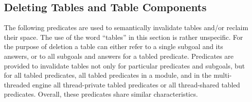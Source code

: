 \begin{description}


\subsection{Deleting Tables and Table Components}
\label{sec:TablePred:Deleting}

The following predicates are used to semantically invalidate tables
and/or reclaim their space. The use of the word ``tables'' in this
section is rather unspecific.  For the purpose of deletion a table can
either refer to a single subgoal and its answers, or to all subgoals
and answers for a tabled predicate.  Predicates are provided to
invalidate tables not only for particular predicates and subgoals, but
for all tabled predicates, all tabled predicates in a module, and in
the multi-threaded engine all thread-private tabled predicates or all
thread-shared tabled predicates.  Overall, these predicates share
similar characteristics.


\end{description}
